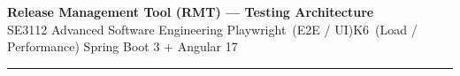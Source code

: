 \documentclass[10pt,a4paper]{article}
\begin{document}
\begin{center}
  {\large\bfseries\color{cblue}Release Management Tool (RMT) — Testing Architecture}\\[2pt]
  {\small
    SE3112 Advanced Software Engineering\quad\textbullet\quad
    Playwright\ (E2E / UI)\quad\textbullet\quad K6\ (Load / Performance)\quad\textbullet\quad
    Spring Boot 3 + Angular 17
  }
\end{center}
\noindent\rule{\linewidth}{0.8pt}
\vspace{3pt}

\end{document}
